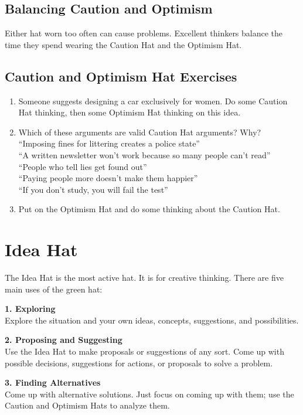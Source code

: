 \subsection*{Balancing Caution and Optimism}
Either hat worn too often can cause problems. Excellent thinkers balance the time they spend wearing the Caution Hat and the Optimism Hat.

\subsection*{Caution and Optimism Hat Exercises}
\begin{enumerate}
	\item Someone suggests designing a car exclusively for women. Do some Caution Hat thinking, then some Optimism Hat thinking on this idea.
	\item Which of these arguments are valid Caution Hat arguments? Why? \\
	``Imposing fines for littering creates a police state'' \\
	``A written newsletter won't work because so many people can't read'' \\
	``People who tell lies get found out'' \\
	``Paying people more doesn't make them happier'' \\
	``If you don't study, you will fail the test''
	\item Put on the Optimism Hat and do some thinking about the Caution Hat.
\end{enumerate}

\section*{Idea Hat}

The Idea Hat is the most active hat. It is for creative thinking. There are five main uses of the green hat:

\textbf{1. Exploring} \\
Explore the situation and your own ideas, concepts, suggestions, and possibilities.

\textbf{2. Proposing and Suggesting} \\
Use the Idea Hat to make proposals or suggestions of any sort. Come up with possible decisions, suggestions for actions, or proposals to solve a problem. 

\textbf{3. Finding Alternatives} \\
Come up with alternative solutions. Just focus on coming up with them; use the Caution and Optimism Hats to analyze them.

